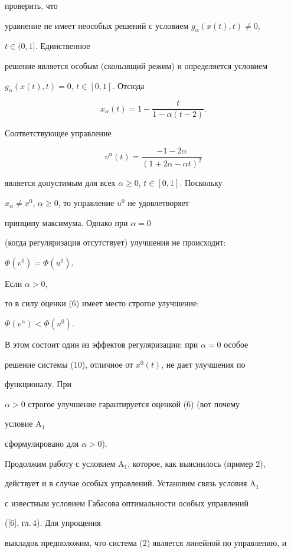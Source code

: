проверить, что 


уравнение не имеет неособых решений с условием $g_\alpha(x(t),t)\ne 0$, 


$t\in(0,1]$. Единственное 


решение является особым (скользящий режим) и определяется условием 


$g_\alpha(x(t),t)=0$, $t\in[0,1]$. Отсюда 


$$ 


x_\alpha(t)=1-\frac{t}{1-\alpha(t-2)}. 


$$ 


Соответствующее управление 


$$ 


v^\alpha(t)=\frac{-1-2\alpha}{(1+2\alpha-\alpha t)^2} 


$$ 


является допустимым для всех $\alpha\ge 0$, $t\in[0,1]$. Поскольку 


$x_\alpha\ne x^0$, $\alpha\ge 0$, то управление $u^0$ не удовлетворяет 


принципу максимума. Однако при $\alpha=0$ 


(когда регуляризация отсутствует) улучшения не происходит: 


$\Phi(v^0)=\Phi(u^0)$. 


Если $\alpha>0$, 


то в силу оценки (6) имеет место строгое улучшение:


$\Phi(v^\alpha)<\Phi(u^0)$. 


В этом состоит один из эффектов регуляризации: при $\alpha=0$ особое 


решение системы (10), отличное от $x^0(t)$, не дает улучшения по 


функционалу. При 


$\alpha>0$ строгое улучшение гарантируется оценкой (6) (вот почему 


условие A${}_1$ 


сформулировано для $\alpha>0$). 


 


Продолжим работу с условием A${}_1$, которое, как выяснилось (пример 2), 


действует и в случае особых управлений. Установим связь условия A${}_1$ 


с известным условием Габасова оптимальности особых управлений 


([6], гл.\,4). Для упрощения 


выкладок предположим, что система (2) является линейной по управлению, и 


